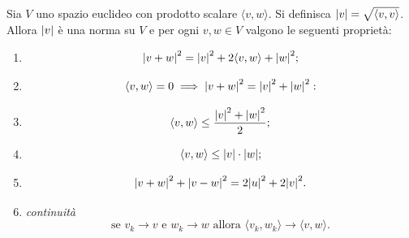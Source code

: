 \begin{theorem}
Sia $V$ uno spazio euclideo con prodotto scalare $\langle v, w\rangle$.
Si definisca ${\left|v\right|} = \sqrt{\langle v,v\rangle}$.
Allora ${\left|v\right|}$ è una norma su $V$
e per ogni $v,w\in V$ valgono le seguenti proprietà:
\begin{enumerate}
\item {}
\[
  {\left|v+w\right|}^2 = {\left|v\right|}^2 + 2 \langle v,w\rangle + {\left|w\right|}^2 ;
\]
\item {}
%
%
\begin{equation}\label{eq:Pitagora}
  \langle v,w\rangle=0 \implies {\left|v+w\right|}^2 = {\left|v\right|}^2 + {\left|w\right|}^2:
\end{equation}
\item {}
%
\begin{equation}\label{eq:Young}
  \langle v,w\rangle \le \frac{{\left|v\right|}^2 + {\left|w\right|}^2}{2};
\end{equation}
\item {}
%
\begin{equation}\label{eq:Cauchy_Schwarz}
   \langle v,w \rangle \le {\left|v\right|} \cdot {\left|w\right|};
\end{equation}
\item {}
\begin{equation}\label{eq:parallelogramma}
  {\left|v+w\right|}^2 + {\left|v-w\right|}^2 = 2 {\left|u\right|}^2 + 2{\left|v\right|}^2.
\end{equation}
\item \emph{continuità}
\[
  \text{se $v_k\to v$ e $w_k\to w$ allora
  $\langle v_k,w_k\rangle \to \langle v,w \rangle$}.
\]
\end{enumerate}
\end{theorem}
%
